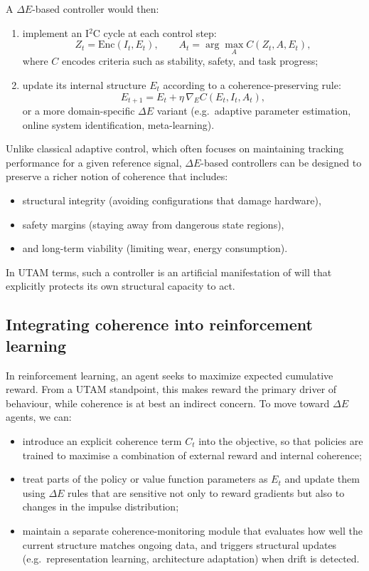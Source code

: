 \documentclass[12pt,a4paper]{report}
\begin{document}
A $\Delta E$-based controller would then:

\begin{enumerate}[leftmargin=2em]
    \item implement an I$^2$C cycle at each control step:
    \[
        Z_t = \mathrm{Enc}(I_t, E_t), \qquad
        A_t = \arg\max_{A} C(Z_t, A, E_t),
    \]
    where \(C\) encodes criteria such as stability, safety, and task progress;
    \item update its internal structure \(E_t\) according to a coherence-preserving rule:
    \[
        E_{t+1} = E_t + \eta \, \nabla_E C(E_t, I_t, A_t),
    \]
    or a more domain-specific $\Delta E$ variant (e.g.\ adaptive parameter estimation, online system identification, meta-learning).
\end{enumerate}

Unlike classical adaptive control, which often focuses on maintaining tracking performance for a given reference signal, $\Delta E$-based controllers can be designed to preserve a richer notion of coherence that includes:

\begin{itemize}[leftmargin=2em]
    \item structural integrity (avoiding configurations that damage hardware),
    \item safety margins (staying away from dangerous state regions),
    \item and long-term viability (limiting wear, energy consumption).
\end{itemize}

In UTAM terms, such a controller is an artificial manifestation of will that explicitly protects its own structural capacity to act.

\subsection*{Integrating coherence into reinforcement learning}

In reinforcement learning, an agent seeks to maximize expected cumulative reward. From a UTAM standpoint, this makes reward the primary driver of behaviour, while coherence is at best an indirect concern. To move toward $\Delta E$ agents, we can:

\begin{itemize}[leftmargin=2em]
    \item introduce an explicit coherence term \(C_t\) into the objective, so that policies are trained to maximise a combination of external reward and internal coherence;
    \item treat parts of the policy or value function parameters as \(E_t\) and update them using $\Delta E$ rules that are sensitive not only to reward gradients but also to changes in the impulse distribution;
    \item maintain a separate coherence-monitoring module that evaluates how well the current structure matches ongoing data, and triggers structural updates (e.g.\ representation learning, architecture adaptation) when drift is detected.
\end{itemize}
\end{document}
